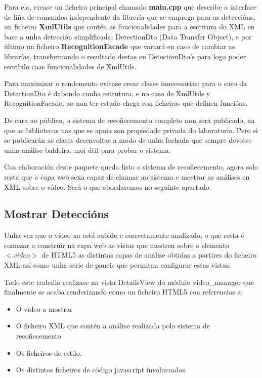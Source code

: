             Para elo, crease un ficheiro principal chamado \textbf{main.cpp} que describe a interface de liña de comandos
            independente da librería que se emprega para as deteccións, un ficheiro \textbf{XmlUtils} que contén as
            funcionalidades para a escritura do XML en base a unha detección simplificada: DetectionDto 
            (Data Transfer Object), e por último un ficheiro \textbf{RecognitionFacade} que variará en 
            caso de cambiar as librarías, transformando o resultado destas en DetectionDto's para logo
            poder escribilo coas funcionalidades de XmlUtils.
            
            Para maximizar o rendemento evitase crear clases innecesarias: para o caso da DetectionDto é dabondo
            cunha estrutura, e no caso de XmlUtils y RecognitionFacade, ao non ter estado chega con ficheiros
            que definen funcións.
            
            De cara ao público, o sistema de recoñecemento completo non será publicado, xa que as 
            bibliotecas nas que se apoia son propiedade privada do laboratorio. Pero si se 
            publicarán as clases desenvoltas a modo de unha fachada que sempre devolve unha análise
            baldeira, moi útil para probar o sistema. 
            
            Coa elaboración deste paquete queda listo o sistema de recoñecemento, agora solo resta que a capa web
            sexa capaz de chamar ao sistema e mostrar as análises en XML sobre o vídeo. Será o que abordaremos
            no seguinte apartado.

    \subsection{Mostrar Deteccións}
        
        Unha vez que o vídeo xa está subido e correctamente analizado, o que resta é comezar a construír
        na capa web as vistas que mostren sobre o elemento $<video>$ de HTML5 as distintas capas de 
        análise obtidas a partires do ficheiro XML así como unha serie de paneis que permitan 
        configurar estas vistas.
        
        Todo este traballo realizase na vista DetailsView do módulo video\_manager que finalmente se
        acaba renderizando como un ficheiro HTML5 con referencias a:
        \begin{itemize}
        \item O vídeo a mostrar
        \item O ficheiro XML que contén a análise realizada polo sistema de recoñecemento.
        \item Os ficheiros de estilo.
        \item Os distintos ficheiros de código javascript involucrados.
        \end{itemize}
        
